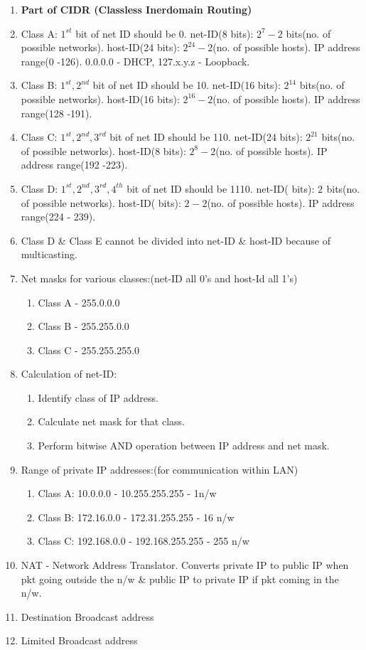 \documentclass[a4paper,oneside]{book}
\begin{document}
\begin{enumerate}
\item \textbf{Part of CIDR (Classless Inerdomain Routing)}
\item Class A: $1^{st}$ bit of net ID should be 0. net-ID(8 bits): $2^7 - 2$ bits(no. of possible networks). host-ID(24 bits): $2^{24} - 2$(no. of possible hosts). IP address range(0 -126). 0.0.0.0 - DHCP, 127.x.y.z - Loopback.
\item Class B: $1^{st}, 2^{nd}$ bit of net ID should be 10. net-ID(16 bits): $2^{14}$ bits(no. of possible networks). host-ID(16 bits): $2^{16} - 2$(no. of possible hosts). IP address range(128 -191). 
\item Class C: $1^{st}, 2^{nd}, 3^{rd}$ bit of net ID should be 110. net-ID(24 bits): $2^{21}$ bits(no. of possible networks). host-ID(8 bits): $2^{8} - 2$(no. of possible hosts). IP address range(192 -223). 
\item Class D: $1^{st}, 2^{nd}, 3^{rd}, 4^{th}$ bit of net ID should be 1110. net-ID( bits): $2^{}$ bits(no. of possible networks). host-ID( bits): $2^{} - 2$(no. of possible hosts). IP address range(224 - 239). 
\item Class D \& Class E cannot be divided into net-ID \& host-ID because of multicasting.
\item Net masks for various classes:(net-ID all 0's and host-Id all 1's) 
\begin{enumerate}
\item Class A - 255.0.0.0
\item Class B - 255.255.0.0
\item Class C - 255.255.255.0
\end{enumerate}
\item Calculation of net-ID:
\begin{enumerate}
\item Identify class of IP address. 
\item Calculate net mask for that class.
\item Perform bitwise AND operation between IP address and net mask.
\end{enumerate}
\item Range of private IP addresses:(for communication within LAN)
\begin{enumerate}
\item Class A: 10.0.0.0 - 10.255.255.255 - 1n/w
\item Class B: 172.16.0.0 - 172.31.255.255 - 16 n/w
\item Class C: 192.168.0.0 - 192.168.255.255 - 255 n/w
\end{enumerate}
\item NAT -  Network Address Translator. Converts private IP to public IP when pkt going outside the n/w \& public IP to private IP if pkt coming in the n/w.
\item Destination Broadcast address
\item Limited Broadcast address
\end{enumerate}
\end{document}
